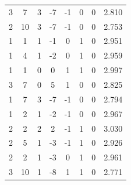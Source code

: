 \documentclass[a4paper, 12pt]{article}
\begin{document}
\begin{table}[H]
\begin{tabular}{@{}cccccccc@{}}
    3                      & 7                      & 3                      & -7                     & -1                & 0                 & 0                 & 2.810               \\
    2                      & 10                     & 3                      & -7                     & -1                & 0                 & 0                 & 2.753               \\
    1                      & 1                      & 1                      & -1                     & 0                 & 1                 & 0                 & 2.951               \\
    1                      & 4                      & 1                      & -2                     & 0                 & 1                 & 0                 & 2.959               \\
    1                      & 1                      & 0                      & 0                      & 1                 & 1                 & 0                 & 2.997               \\
    3                      & 7                      & 0                      & 5                      & 1                 & 0                 & 0                 & 2.825               \\
    1                      & 7                      & 3                      & -7                     & -1                & 0                 & 0                 & 2.794               \\
    1                      & 2                      & 1                      & -2                     & -1                & 0                 & 0                 & 2.967               \\
    2                      & 2                      & 2                      & 2                      & -1                & 1                 & 0                 & 3.030               \\
    2                      & 5                      & 1                      & -3                     & -1                & 1                 & 0                 & 2.926               \\
    2                      & 2                      & 1                      & -3                     & 0                 & 1                 & 0                 & 2.961               \\
    3                      & 10                     & 1                      & -8                     & 1                 & 1                 & 0                 & 2.771               \\ \bottomrule
    \end{tabular}
    \end{table}
\end{document}
